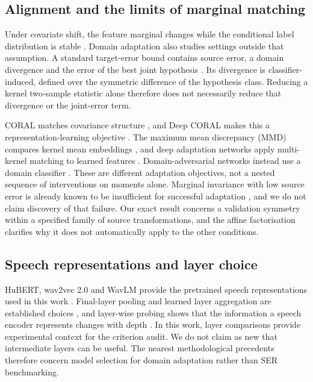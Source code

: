 \subsection{Alignment and the limits of marginal matching}
\label{sec:related-alignment}

Under covariate shift, the feature marginal changes while the conditional
label distribution is stable \cite{shimodaira2000covariate}. Domain adaptation
also studies settings outside that assumption. A standard target-error bound
contains source error, a domain divergence and the error of the best joint
hypothesis \cite{bendavid2010theory}. Its divergence is classifier-induced,
defined over the symmetric difference of the hypothesis class. Reducing a
kernel two-sample statistic alone therefore does not necessarily reduce that
divergence or the joint-error term.

CORAL matches covariance structure \cite{sun2016coral}, and Deep CORAL makes
this a representation-learning objective \cite{sun2016deep}. The maximum mean
discrepancy (MMD) compares kernel mean embeddings
\cite{gretton2012kernel}, and deep adaptation networks
apply multi-kernel matching to learned features \cite{long2015dan}.
Domain-adversarial networks instead use a domain classifier
\cite{ganin2016dann}. These are different adaptation objectives, not a nested
sequence of interventions on moments alone. Marginal invariance with low source
error is already known to be insufficient for successful adaptation
\cite{zhao2019invariant}, and we do not claim discovery of that failure. Our
exact result concerns a validation symmetry within a specified family of source
transformations, and the affine factorisation clarifies why it does not
automatically apply to the other conditions.

\subsection{Speech representations and layer choice}
\label{sec:related-ssl}

HuBERT, wav2vec 2.0 and WavLM provide the pretrained speech representations
used in this work \cite{hsu2021hubert,baevski2020wav2vec,chen2022wavlm}.
Final-layer pooling and learned layer aggregation are established choices
\cite{yang2021superb}, and layer-wise probing shows that the information a
speech encoder represents changes with depth \cite{pasad2021layer}. In this
work, layer comparisons provide experimental context for the criterion audit.
We do not claim as new that intermediate layers can be useful. The nearest
methodological precedents therefore concern model selection for domain
adaptation rather than SER benchmarking.
